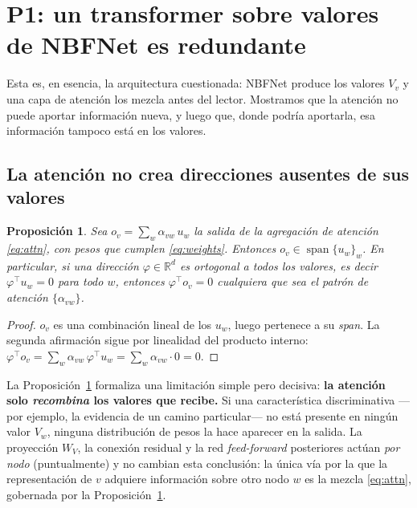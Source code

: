 \documentclass[11pt]{article}
\theoremstyle{plain}
\newtheorem{proposition}{Proposición}[section]
\theoremstyle{definition}
\newcommand{\R}{\mathbb{R}}
\newcommand{\spanop}{\operatorname{span}}
\begin{document}
\section{P1: un transformer sobre valores de NBFNet es redundante}
\label{sec:q1}

Esta es, en esencia, la arquitectura cuestionada: NBFNet produce los valores $V_v$ y una capa de
atención los mezcla antes del lector. Mostramos que la atención no puede aportar información nueva, y
luego que, donde podría aportarla, esa información tampoco está en los valores.

\subsection{La atención no crea direcciones ausentes de sus valores}

\begin{proposition}
\label{prop:span}
Sea $o_v=\sum_w \alpha_{vw}\, u_w$ la salida de la agregación de atención \eqref{eq:attn}, con pesos
que cumplen \eqref{eq:weights}. Entonces $o_v\in\spanop\{u_w\}_w$. En particular, si una dirección
$\varphi\in\R^{d}$ es ortogonal a todos los valores, es decir $\varphi^{\!\top}u_w=0$ para todo $w$,
entonces $\varphi^{\!\top}o_v=0$ \emph{cualquiera que sea el patrón de atención} $\{\alpha_{vw}\}$.
\end{proposition}

\begin{proof}
$o_v$ es una combinación lineal de los $u_w$, luego pertenece a su \emph{span}. La segunda afirmación
sigue por linealidad del producto interno:
$\varphi^{\!\top}o_v=\sum_w \alpha_{vw}\,\varphi^{\!\top}u_w=\sum_w \alpha_{vw}\cdot 0=0.$
\end{proof}

La Proposición~\ref{prop:span} formaliza una limitación simple pero decisiva: \textbf{la atención solo
\emph{recombina} los valores que recibe.} Si una característica discriminativa ---por ejemplo, la
evidencia de un camino particular--- no está presente en ningún valor $V_w$, ninguna distribución de
pesos la hace aparecer en la salida. La proyección $W_V$, la conexión residual y la red
\emph{feed-forward} posteriores actúan \emph{por nodo} (puntualmente) y no cambian esta conclusión: la
única vía por la que la representación de $v$ adquiere información sobre otro nodo $w$ es la mezcla
\eqref{eq:attn}, gobernada por la Proposición~\ref{prop:span}.
\end{document}
